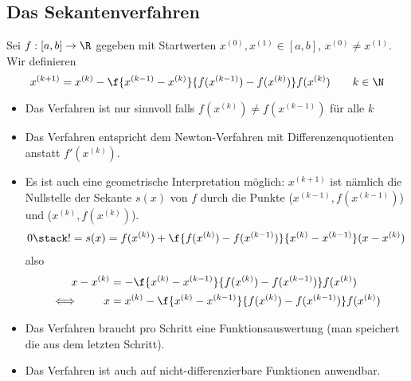\documentclass[11pt]{scrbook}
\begin{document}
\subsection{Das Sekantenverfahren}

\begin{df}[Sekantenverfahren] \label{3.5}
	Sei $f:[a,b] \to \R$ gegeben mit Startwerten $x^{(0)}, x^{(1)} \in [a,b]$, $x^{(0)} \neq x^{(1)}$.
	Wir definieren
	\[
		x^{(k+1)} = x^{(k)} - \f {x^{(k-1)} - x^{(k)}}{f(x^{(k-1)}) - f(x^{(k)})} f(x^{(k)})
		\qquad k\in \N
	\]
	\begin{note}
		\begin{itemize}
			\item
				Das Verfahren ist nur sinnvoll falls $f(x^{(k)}) \neq f(x^{(k-1)})$ für alle $k$
			\item
				Das Verfahren entspricht dem Newton-Verfahren mit Differenzenquotienten anstatt $f'(x^{(k)})$.
			\item
				Es ist auch eine geometrische Interpretation möglich:
				$x^{(k+1)}$ ist nämlich die Nullstelle der Sekante $s(x)$ von $f$ durch die Punkte ($x^{(k-1)}, f(x^{(k-1)})$) und ($x^{(k)},f(x^{(k)})$).
				\begin{align*}
					0 \stack != s(x) = f(x^{(k)}) + \f {f(x^{(k)})-f(x^{(k-1)})}{x^{(k)}-x^{(k-1)}} (x-x^{(k)})
				\end{align*}
				also
				\begin{align*}
					x-x^{(k)} &= - \f {x^{(k)}-x^{(k-1)}}{f(x^{(k)}) - f(x^{(k-1)})} f(x^{(k)}) \\
					\iff \qquad
					x &= x^{(k)} - \f {x^{(k)}-x^{(k-1)}}{f(x^{(k)}) - f(x^{(k-1)})} f(x^{(k)})
				\end{align*}
			\item
				Das Verfahren braucht pro Schritt eine Funktionsauswertung (man speichert die aus dem letzten Schritt).
			\item
				Das Verfahren ist auch auf nicht-differenzierbare Funktionen anwendbar.
		\end{itemize}
	\end{note}
\end{df}
\end{document}
